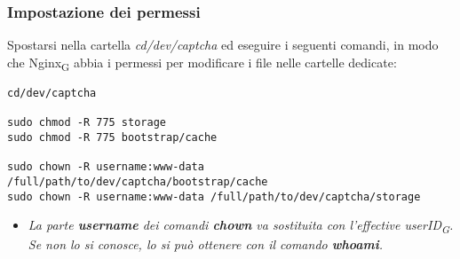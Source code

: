 \subsubsection{Impostazione dei permessi}
Spostarsi nella cartella \textit{cd/dev/captcha} ed eseguire i seguenti comandi, in modo che Nginx\textsubscript{G} abbia i permessi per modificare i file nelle cartelle dedicate:
\begin{verbatim}
cd/dev/captcha

sudo chmod -R 775 storage
sudo chmod -R 775 bootstrap/cache

sudo chown -R username:www-data /full/path/to/dev/captcha/bootstrap/cache 
sudo chown -R username:www-data /full/path/to/dev/captcha/storage
\end{verbatim}
\begin{itemize}
	\item \textit{La parte \textbf{username} dei comandi \textbf{chown} va sostituita con l'effective userID\textsubscript{G}. Se non lo si conosce, lo si può ottenere con il comando \textbf{whoami}.} 
\end{itemize} 

